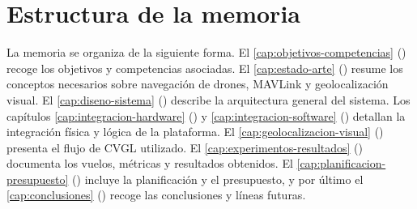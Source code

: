 \section{Estructura de la memoria}
\label{sec:introduccion-estructura}

La memoria se organiza de la siguiente forma. El \autoref{cap:objetivos-competencias} () recoge los objetivos y competencias asociadas. El \autoref{cap:estado-arte} () resume los conceptos necesarios sobre navegación de drones, MAVLink y geolocalización visual. El \autoref{cap:diseno-sistema} () describe la arquitectura general del sistema. Los capítulos \ref{cap:integracion-hardware} () y \ref{cap:integracion-software} () detallan la integración física y lógica de la plataforma. El \autoref{cap:geolocalizacion-visual} () presenta el flujo de CVGL utilizado. El \autoref{cap:experimentos-resultados} () documenta los vuelos, métricas y resultados obtenidos. El \autoref{cap:planificacion-presupuesto} () incluye la planificación y el presupuesto, y por último el \autoref{cap:conclusiones} () recoge las conclusiones y líneas futuras.

